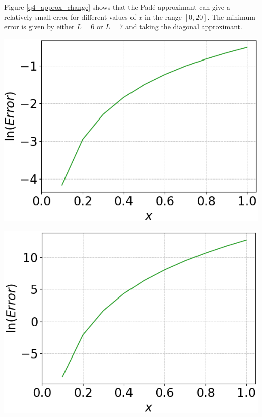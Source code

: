 \documentclass[12pt, a4paper]{article}
\begin{document}
Figure \ref{q4_approx_change} shows that the Pad\'e approximant can give a relatively small error
for different values of $x$ in the range $[0, 20]$. The minimum error is given by either $L = 6$ or
$L = 7$ and taking the diagonal approximant.
\\

\begin{minipage}{0.45\textwidth}
	\centering
	\includegraphics[width=\linewidth]{q4_series_order=1}

	\vspace*{-0.2cm}

	\label{q4_series_o1}
\end{minipage}
\hspace{0.9cm}
\begin{minipage}{0.45\textwidth}
	\centering
	\includegraphics[width=\linewidth]{q4_series_order=9}

	\vspace*{-0.2cm}

	\label{q4_series_o2}
\end{minipage}
\vspace{0.5cm}
\end{document}
